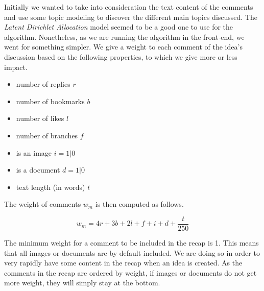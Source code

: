 \documentclass[a4paper,12pt, oneside]{article}
\begin{document}
Initially we wanted to take into consideration the text content of the comments and use some topic modeling to discover the different main topics discussed.
The \emph{Latent Dirichlet Allocation} \cite{blei2003latent} model seemed to be a good one to use for the algorithm.
Nonetheless, as we are running the algorithm in the front-end, we went for something simpler.
We give a weight to each comment of the idea's discussion based on the following properties, to which we give more or less impact.

\begin{multicols}{2}
    \begin{itemize}
        \item number of replies $r$
        \item number of bookmarks $b$
        \item number of likes $l$
        \item number of branches $f$
        \item is an image $i = 1 | 0$
        \item is a document $d = 1 | 0$
        \item text length (in words) $t$
    \end{itemize}
\end{multicols}

The weight of comments $w_m$ is then computed as follows.

\begin{equation}
    \label{eq.commentWeightInRecap}
    w_m = 4r + 3b + 2l + f + i + d + \frac{t}{250}
\end{equation}

The minimum weight for a comment to be included in the recap is 1.
This means that all images or documents are by default included.
We are doing so in order to very rapidly have some content in the recap when an idea is created.
As the comments in the recap are ordered by weight, if images or documents do not get more weight, they will simply stay at the bottom.
\end{document}
